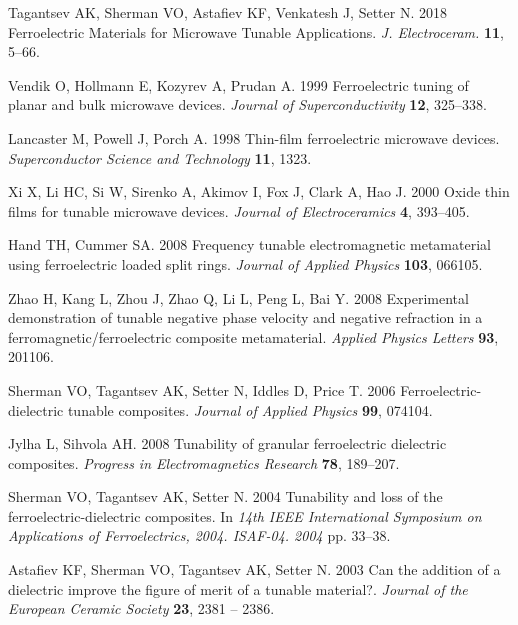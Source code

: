 \documentclass[aps,prb,11pt]{revtex4-1}
\begin{document}
\begin{thebibliography}{99}

Tagantsev AK, Sherman VO, Astafiev KF, Venkatesh J, Setter N. 2018
  Ferroelectric {Materials} for {Microwave} {Tunable} {Applications}. {\em J.
  Electroceram.} \textbf{11}, 5--66.

Vendik O, Hollmann E, Kozyrev A, Prudan A. 1999  Ferroelectric tuning of planar
  and bulk microwave devices. {\em Journal of Superconductivity} \textbf{12},
  325--338.

Lancaster M, Powell J, Porch A. 1998  Thin-film ferroelectric microwave
  devices. {\em Superconductor Science and Technology} \textbf{11}, 1323.

Xi X, Li HC, Si W, Sirenko A, Akimov I, Fox J, Clark A, Hao J. 2000  Oxide thin
  films for tunable microwave devices. {\em Journal of Electroceramics}
  \textbf{4}, 393--405.

Hand TH, Cummer SA. 2008  Frequency tunable electromagnetic metamaterial using
  ferroelectric loaded split rings. {\em Journal of Applied Physics}
  \textbf{103}, 066105.

Zhao H, Kang L, Zhou J, Zhao Q, Li L, Peng L, Bai Y. 2008  Experimental
  demonstration of tunable negative phase velocity and negative refraction in a
  ferromagnetic/ferroelectric composite metamaterial. {\em Applied Physics
  Letters} \textbf{93}, 201106.

Sherman VO, Tagantsev AK, Setter N, Iddles D, Price T. 2006
  Ferroelectric-dielectric tunable composites. {\em Journal of Applied Physics}
  \textbf{99}, 074104.

Jylha L, Sihvola AH. 2008  Tunability of granular ferroelectric dielectric
  composites. {\em Progress in Electromagnetics Research} \textbf{78},
  189--207.

Sherman VO, Tagantsev AK, Setter N. 2004  Tunability and loss of the
  ferroelectric-dielectric composites. In {\em 14th {IEEE} {International}
  {Symposium} on {Applications} of {Ferroelectrics}, 2004. {ISAF}-04. 2004} pp.
  33--38.

Astafiev KF, Sherman VO, Tagantsev AK, Setter N. 2003  Can the addition of a
  dielectric improve the figure of merit of a tunable material?. {\em Journal
  of the European Ceramic Society} \textbf{23}, 2381 -- 2386.


\end{thebibliography}
\end{document}
